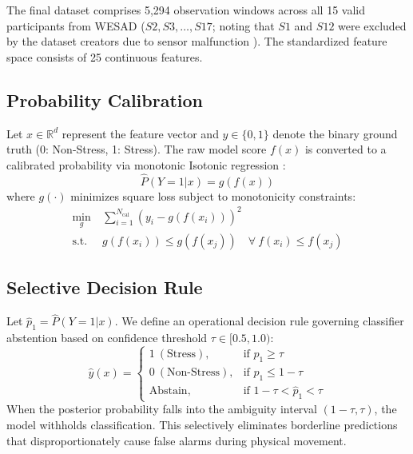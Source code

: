 \documentclass[conference]{IEEEtran}
\begin{document}
The final dataset comprises 5,294 observation windows across all 15 valid participants from WESAD ($S2, S3, \dots, S17$; noting that $S1$ and $S12$ were excluded by the dataset creators due to sensor malfunction \cite{schmidt2018wesad}). The standardized feature space consists of 25 continuous features.

\subsection{Probability Calibration}
Let $x \in \mathbb{R}^d$ represent the feature vector and $y \in \{0, 1\}$ denote the binary ground truth (0: Non-Stress, 1: Stress). The raw model score $f(x)$ is converted to a calibrated probability via monotonic Isotonic regression \cite{zadrozny2002transforming, niculescu2005predicting}:
\begin{equation}
\hat{P}(Y=1|x) = g(f(x))
\end{equation}
where $g(\cdot)$ minimizes square loss subject to monotonicity constraints:
\begin{equation}
\begin{aligned}
\min_{g} \ & \sum_{i=1}^{N_{\text{cal}}} \left( y_i - g(f(x_i)) \right)^2 \\
\text{s.t.} \ & g(f(x_i)) \le g(f(x_j)) \quad \forall \ f(x_i) \le f(x_j)
\end{aligned}
\end{equation}

\subsection{Selective Decision Rule}
Let $\hat{p}_1 = \hat{P}(Y=1|x)$. We define an operational decision rule governing classifier abstention based on confidence threshold $\tau \in [0.5, 1.0)$:
\begin{equation}
\hat{y}(x) =
\begin{cases}
1 \ (\text{Stress}), & \text{if } \hat{p}_1 \ge \tau \\
0 \ (\text{Non-Stress}), & \text{if } \hat{p}_1 \le 1 - \tau \\
\text{Abstain}, & \text{if } 1 - \tau < \hat{p}_1 < \tau
\end{cases}
\end{equation}
When the posterior probability falls into the ambiguity interval $(1-\tau, \tau)$, the model withholds classification. This selectively eliminates borderline predictions that disproportionately cause false alarms during physical movement.
\end{document}
